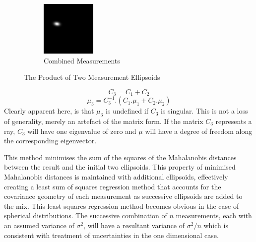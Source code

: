 \documentclass[a4paper, 11pt, titlepage]{article}
\begin{document}
\begin{figure}
      \begin{subfigure}{.3\textwidth}
        \centering
        \includegraphics[width=.8\linewidth]{images/GaussianLine3.png}
        \caption{Combined Measurements}
        \label{fig:uncProdsub3}
      \end{subfigure}
      \caption{The Product of Two Measurement Ellipsoids}
      \label{fig:uncProd}
      \end{figure}

      \begin{equation}
      C_3 = C_1+C_2
      \end{equation}
      \begin{equation}
      \mu_3 = C_3^{-1} . (C_1.\mu_1 + C_2.\mu_2)
      \end{equation}
      Clearly apparent here, is that \(\mu_3\) is undefined if \(C_3\) is singular.
      This is not a loss of generality, merely an artefact of the matrix form.  If the matrix \(C_3\) represents a ray, \(C_3\)  will have one eigenvalue of zero and \(\mu\) will have a degree of freedom along the corresponding eigenvector.
      
      This method minimises the sum of the squares of the Mahalanobis distances between the result and the initial two ellipsoids.  This property of minimised Mahalanobis distances is maintained with additional ellipsoids, effectively creating a least sum of squares regression method that accounts for the covariance geometry of each measurement as successive ellipsoids are added to the mix.
      This least squares regression method becomes obvious in the case of spherical distributions.  The successive combination of \(n\) measurements, each with an assumed variance of \(\sigma^2\), will have a resultant variance of \(\sigma^2/n\) which is consistent with treatment of uncertainties in the one dimensional case.
\end{document}

